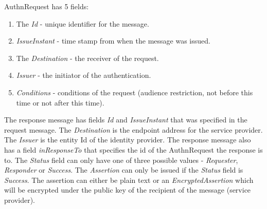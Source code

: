 \documentclass[twosided]{report}
\begin{document}
AuthnRequest has 5 fields:
\begin{enumerate}
	\item The \emph{Id} - unique identifier for the message.
	\item \emph{IssueInstant} - time stamp from when the message was issued.
	\item The \emph{Destination} - the receiver of the request.
	\item \emph{Issuer} - the initiator of the authentication.
	\item \emph{Conditions} - conditions of the request (audience restriction, not before this time or not after this time).
\end{enumerate}

\par
The response message has fields \emph{Id} and \emph{IssueInstant} that was specified in the request message. The \emph{Destination} is the endpoint address for the service provider. The \emph{Issuer} is the entity Id of the identity provider. The response message also has a field \emph{inResponseTo} that specifies the id of the AuthnRequest the response is to. The \emph{Status} field can only have one of three possible values - \emph{Requester}, \emph{Responder} or \emph{Success}. The \emph{Assertion} can only be issued if the \emph{Status} field is \emph{Success}. The assertion can either be plain text or an \emph{EncryptedAssertion} which will be encrypted under the public key of the recipient of the message (service provider).
\end{document}
